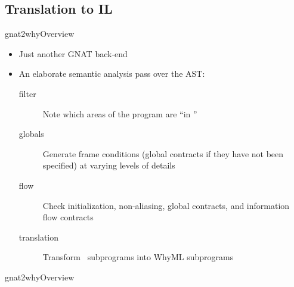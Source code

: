 \documentclass{beamer}
\begin{document}
\subsection{Translation to IL}
\begin{frame}{gnat2why}{Overview}
  \begin{itemize}
  \item Just another GNAT back-end
  \item An elaborate semantic analysis pass over the AST:
    \begin{description}
    \item[filter] Note which areas of the program are ``in \spark''
    \item[globals] Generate frame conditions (global contracts if they
      have not been specified) at varying levels of details
    \item[flow] Check initialization, non-aliasing, global contracts,
      and information flow contracts
    \item[translation] Transform \spark\ subprograms into WhyML
      subprograms
    \end{description}
  \end{itemize}
\end{frame}

\begin{frame}{gnat2why}{Overview}
  \begin{center}
  \end{center}
\end{frame}
\end{document}
